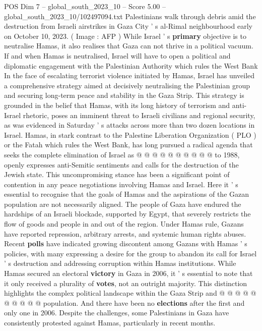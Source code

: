 \begin{textsample}{POS Dim 7 – global\_south\_2023\_10 – Score 5.00 – global\_south\_2023\_10/102497094.txt}  \label{ex:f7_pos_389}
Palestinians walk through debris amid the destruction from Israeli airstrikes in Gaza City ' s al-Rimal neighbourhood early on October 10, 2023. ( Image : AFP ) While Israel ' s \textbf{primary} objective is to neutralise Hamas, it also realises that Gaza can not thrive in a political vacuum.
If and when Hamas is neutralised, Israel will have to open a political and diplomatic engagement with the Palestinian Authority which rules the West Bank In the face of escalating terrorist violence initiated by Hamas, Israel has unveiled a comprehensive strategy aimed at decisively neutralising the Palestinian group and securing long-term peace and stability in the Gaza Strip.
This strategy is grounded in the belief that Hamas, with its long history of terrorism and anti-Israel rhetoric, poses an imminent threat to Israeli civilians and regional security, as was evidenced in Saturday ' s attacks across more than two dozen locations in Israel.
Hamas, in stark contrast to the Palestine Liberation Organization ( PLO ) or the Fatah which rules the West Bank, has long pursued a radical agenda that seeks the complete elimination of Israel as @ @ @ @ @ @ @ @ @ @ to 1988, openly expresses anti-Semitic sentiments and calls for the destruction of the Jewish state.
This uncompromising stance has been a significant point of contention in any peace negotiations involving Hamas and Israel.
Here it ' s essential to recognise that the goals of Hamas and the aspirations of the Gazan population are not necessarily aligned.
The people of Gaza have endured the hardships of an Israeli blockade, supported by Egypt, that severely restricts the flow of goods and people in and out of the region.
Under Hamas rule, Gazans have reported repression, arbitrary arrests, and systemic human rights abuses.
Recent \textbf{polls} have indicated growing discontent among Gazans with Hamas ' s policies, with many expressing a desire for the group to abandon its call for Israel ' s destruction and addressing corruption within Hamas institutions.
While Hamas secured an electoral \textbf{victory} in Gaza in 2006, it ' s essential to note that it only received a plurality of \textbf{votes}, not an outright majority.
This distinction highlights the complex political landscape within the Gaza Strip and @ @ @ @ @ @ @ @ @ @ population.
And there have been no \textbf{elections} after the first and only one in 2006.
Despite the challenges, some Palestinians in Gaza have consistently protested against Hamas, particularly in recent months.

\end{textsample}

